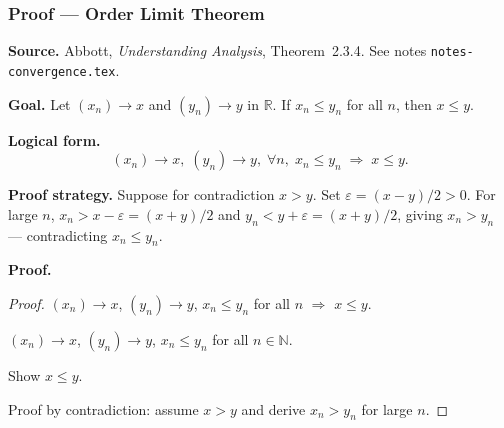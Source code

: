 
\clearpage
{}
\hypertarget{proof-RA-ABB-P-order-limit}{}

\subsubsection[Order Limit Theorem]{Proof --- Order Limit Theorem}

\bigskip

\noindent
\textbf{Source.}
Abbott, \emph{Understanding Analysis}, Theorem~2.3.4.
See notes \texttt{notes-convergence.tex}.

\vspace{0.75em}

\noindent
\textbf{Goal.}
Let $(x_n) \to x$ and $(y_n) \to y$ in $\mathbb{R}$. If $x_n \le y_n$ for
all $n$, then $x \le y$.

\vspace{0.75em}

\noindent
\textbf{Logical form.}
\[
  (x_n) \to x,\; (y_n) \to y,\; \forall n,\; x_n \le y_n
  \;\Rightarrow\; x \le y.
\]

\vspace{0.75em}

\noindent
\textbf{Proof strategy.}
Suppose for contradiction $x > y$. Set $\varepsilon = (x - y)/2 > 0$.
For large $n$, $x_n > x - \varepsilon = (x + y)/2$ and $y_n < y + \varepsilon = (x + y)/2$,
giving $x_n > y_n$ — contradicting $x_n \le y_n$.

\vspace{0.75em}

\noindent
\textbf{Proof.}
\begin{proof}
\Claim $(x_n) \to x$, $(y_n) \to y$, $x_n \le y_n$ for all $n$ $\Rightarrow$ $x \le y$.

\Given $(x_n) \to x$, $(y_n) \to y$, $x_n \le y_n$ for all $n \in \mathbb{N}$.

\Goal Show $x \le y$.

\Strategy Proof by contradiction: assume $x > y$ and derive $x_n > y_n$ for
large $n$.

\medskip





\end{proof}

